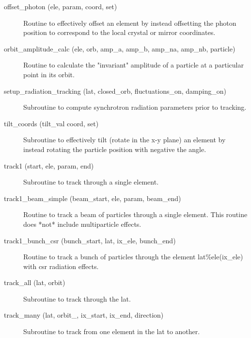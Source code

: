 \begin{description}
\label{r:offset.photon}
\item[offset_photon (ele, param, coord, set)] \Newline 
Routine to effectively offset an element by instead offsetting
the photon position to correspond to the local crystal or mirror coordinates.

\label{r:orbit.amplitude.calc}
\item[orbit_amplitude_calc (ele, orb, amp_a, amp_b, amp_na, amp_nb, particle)] \Newline
Routine to calculate the "invariant" amplitude of a particle at a 
particular point in its orbit. 

\label{r:setup.radiation.tracking}
\item[setup_radiation_tracking (lat, closed_orb, fluctuations_on, damping_on)] \Newline
Subroutine to compute synchrotron radiation parameters prior to tracking. 

\label{r:tilt.coords}
\item[tilt_coords (tilt_val coord, set)] \Newline
Subroutine to effectively tilt (rotate in the x-y plane) an element by 
instead rotating the particle position with negative the angle. 

\label{r:track1}
\item[track1 (start, ele, param, end)] \Newline
Subroutine to track through a single element. 

\label{r:track1.beam.simple}
\item[track1_beam_simple (beam_start, ele, param, beam_end)] \Newline 
Routine to track a beam of particles through a single element.
This routine does *not* include multiparticle effects.

\label{r:track1.bunch.csr}
\item[track1_bunch_csr (bunch_start, lat, ix_ele, bunch_end)] \Newline 
Routine to track a bunch of particles through the element lat\%ele(ix_ele)
with csr radiation effects.

\label{r:track.all}
\item[track_all (lat, orbit)] \Newline
Subroutine to track through the lat. 

\label{r:track.many}
\item[track_many (lat, orbit_, ix_start, ix_end, direction)] \Newline
Subroutine to track from one element in the lat to another. 


\end{description}
